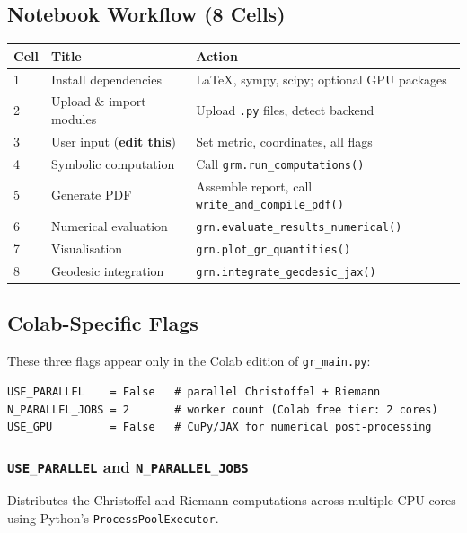 \documentclass[11pt,a4paper]{article}
\newcommand{\code}[1]{\texttt{\small#1}}
\begin{document}
\subsection{Notebook Workflow (8 Cells)}

\begin{center}
\begin{longtable}{lll}
  \toprule
  Cell & Title & Action \\
  \midrule\endhead
  1 & Install dependencies
    & LaTeX, sympy, scipy; optional GPU packages \\
  2 & Upload \& import modules
    & Upload \code{.py} files, detect backend \\
  3 & User input (\textbf{edit this})
    & Set metric, coordinates, all flags \\
  4 & Symbolic computation
    & Call \code{grm.run\_computations()} \\
  5 & Generate PDF
    & Assemble report, call \code{write\_and\_compile\_pdf()} \\
  6 & Numerical evaluation
    & \code{grn.evaluate\_results\_numerical()} \\
  7 & Visualisation
    & \code{grn.plot\_gr\_quantities()} \\
  8 & Geodesic integration
    & \code{grn.integrate\_geodesic\_jax()} \\
  \bottomrule
\end{longtable}
\end{center}

\subsection{Colab-Specific Flags}

These three flags appear only in the Colab edition of \code{gr\_main.py}:

\begin{lstlisting}
USE_PARALLEL    = False   # parallel Christoffel + Riemann
N_PARALLEL_JOBS = 2       # worker count (Colab free tier: 2 cores)
USE_GPU         = False   # CuPy/JAX for numerical post-processing
\end{lstlisting}

\subsubsection{\code{USE\_PARALLEL} and \code{N\_PARALLEL\_JOBS}}

Distributes the Christoffel and Riemann computations across multiple CPU
cores using Python's \code{ProcessPoolExecutor}.
\end{document}
